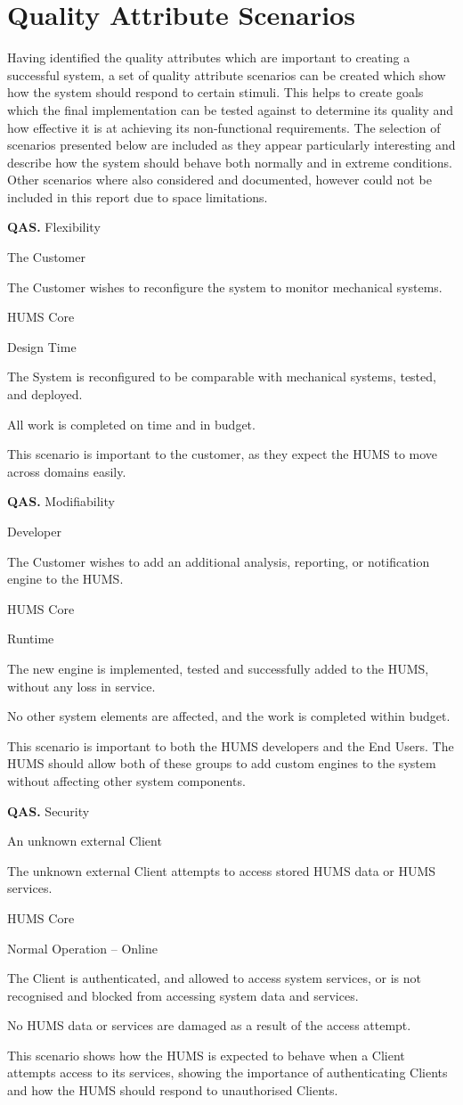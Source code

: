 \documentclass[10pt,a4paper]{article}
\newcommand{\qas}[1]{\textcolor{reqColor}{\textbf{QAS.#1}}}
\newenvironment{scenario}[1]{
\newcommand{\source}[1]{\item[Source of Stimulus:] ##1}
\newcommand{\stimulus}[1]{\item[Stimulus:] ##1}
\newcommand{\artifact}[1]{\item[Artifact:] ##1}
\newcommand{\environment}[1]{\item[Environment:] ##1}
\newcommand{\response}[1]{\item[Response:] ##1}
\newcommand{\measure}[1]{\item[Response Measure:] ##1}
\newcommand{\rationale}[1]{\item[Scenario Rationale:] ##1}
\newcommand{\quality}[1]{\item[Quality:] ##1}
		\begin{description} [noitemsep]	
		\item[Scenario ID:] \qas{#1}
		}{\end{description} \vspace*{0.3cm}
		}
\begin{document}
\section{Quality Attribute Scenarios}
\label{sec:scenarios}
Having identified the quality attributes which are important to creating a successful system, a set of quality attribute scenarios can be created which show how the system should respond to certain stimuli. This helps to create goals which the final implementation can be tested against to determine its quality and how effective it is at achieving its non-functional requirements. The selection of scenarios presented below are included as they appear particularly interesting and describe how the system should behave both normally and in extreme conditions. Other scenarios where also considered and documented, however could not be included in this report due to space limitations.

\begin{scenario}{1}
\quality{Flexibility}
\source{The Customer}
\stimulus{The Customer wishes to reconfigure the system to monitor mechanical systems.}
\artifact{HUMS Core}
\environment{Design Time}
\response{The System is reconfigured to be comparable with mechanical systems, tested, and deployed.}
\measure{All work is completed on time and in budget.}
\rationale{This scenario is important to the customer, as they expect the HUMS to move across domains easily.}
\end{scenario}

\begin{scenario}{2}
\quality{Modifiability}
\source{Developer}
\stimulus{The Customer wishes to add an additional analysis, reporting, or notification engine to the HUMS.}
\artifact{HUMS Core}
\environment{Runtime}
\response{The new engine is implemented, tested and successfully added to the HUMS, without any loss in service.}
\measure{No other system elements are affected, and the work is completed within budget.}
\rationale{This scenario is important to both the HUMS developers and the End Users. The HUMS should allow both of these groups to add custom engines to the system without affecting other system components.}
\end{scenario}

\begin{scenario}{3}
\quality{Security}
\source{An unknown external Client}
\stimulus{The unknown external Client attempts to access stored HUMS data or HUMS services.}
\artifact{HUMS Core}
\environment{Normal Operation -- Online}
\response{The Client is authenticated, and allowed to access system services, or is not recognised and blocked from accessing system data and services.}
\measure{No HUMS data or services are damaged as a result of the access attempt.}
\rationale{This scenario shows how the HUMS is expected to behave when a Client attempts access to its services, showing the importance of authenticating Clients and how the HUMS should respond to unauthorised Clients.}
\end{scenario}
\end{document}
